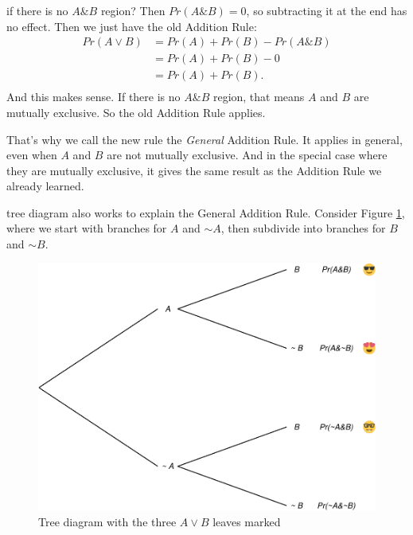 \documentclass[justified]{tufte-book}
\renewcommand{\neg}{\mathbin{\sim}}
\renewcommand{\wedge}{\mathbin{\&}}
\newcommand{\p}{Pr}
\theoremstyle{definition}
\theoremstyle{definition}
\theoremstyle{definition}
\theoremstyle{remark}
\begin{document}
 if there is no \(A \wedge B\) region? Then
\(\p(A \wedge B) = 0\), so subtracting it at the end has no effect. Then
we just have the old Addition Rule: \[
  \begin{aligned}
    \p(A \vee B) &= \p(A) + \p(B) - \p(A \wedge B)\\
                 &= \p(A) + \p(B) - 0\\
                 &= \p(A) + \p(B).\\
  \end{aligned}
\] And this makes sense. If there is no \(A \wedge B\) region, that
means \(A\) and \(B\) are mutually exclusive. So the old Addition Rule
applies.

That's why we call the new rule the \emph{General} Addition Rule. It
applies in general, even when \(A\) and \(B\) are not mutually
exclusive. And in the special case where they are mutually exclusive, it
gives the same result as the Addition Rule we already learned.

 tree diagram also works to explain the General Addition
Rule. Consider Figure \ref{fig:gatree}, where we start with branches for
\(A\) and \(\neg A\), then subdivide into branches for \(B\) and
\(\neg B\).

\begin{figure}
\includegraphics{_main_files/figure-latex/gatree-1} \caption[Tree diagram with the three $A \vee B$ leaves marked]{Tree diagram with the three $A \vee B$ leaves marked}\label{fig:gatree}
\end{figure}
\end{document}
